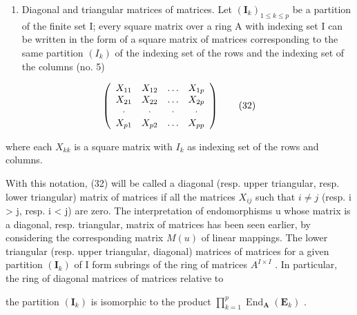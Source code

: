\begin{enumerate}
\def\labelenumi{\Roman{enumi}.}
\setcounter{enumi}{3}
\tightlist
\item
  Diagonal and triangular matrices of matrices. Let \((\mathbf{I}_k)_{1 \leqslant k \leqslant p}\) be a partition of the finite set I; every square matrix over a ring A with indexing set I can be written in the form of a square matrix of matrices corresponding to the same partition \((I_{k})\) of the indexing set of the rows and the indexing set of the columns (no. 5)
\end{enumerate}

\[
\left( \begin{array}{c c c c} X _ {1 1} & X _ {1 2} & \ldots & X _ {1 p} \\ X _ {2 1} & X _ {2 2} & \ldots & X _ {2 p} \\ \cdot & \cdot & \cdot & \cdot \\ X _ {p 1} & X _ {p 2} & \ldots & X _ {p p} \end{array} \right)\tag{32}
\]

where each \(X_{kk}\) is a square matrix with \(I_{k}\) as indexing set of the rows and columns.

With this notation, (32) will be called a diagonal (resp. upper triangular, resp. lower triangular) matrix of matrices if all the matrices \(X_{ij}\) such that \(i \neq j\) (resp. i \textgreater{} j, resp. i \textless{} j) are zero. The interpretation of endomorphisms u whose matrix is a diagonal, resp. triangular, matrix of matrices has been seen earlier, by considering the corresponding matrix \(M(u)\) of linear mappings. The lower triangular (resp. upper triangular, diagonal) matrices of matrices for a given partition \((\mathbf{I}_{k})\) of I form subrings of the ring of matrices \(A^{I \times I}\) . In particular, the ring of diagonal matrices of matrices relative to

the partition \((\mathbf{I}_k)\) is isomorphic to the product \(\prod_{k=1}^{p} \operatorname{End}_{\mathbf{A}}(\mathbf{E}_k)\) .
